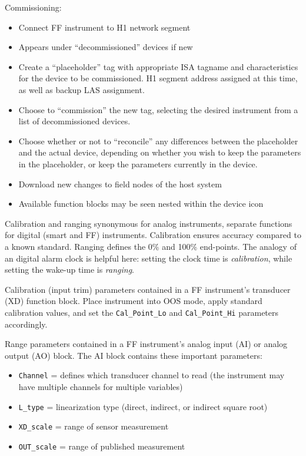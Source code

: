 \vskip 10pt

Commissioning:

\begin{itemize}
\item{} Connect FF instrument to H1 network segment
\item{} Appears under ``decommissioned'' devices if new
\item{} Create a ``placeholder'' tag with appropriate ISA tagname and characteristics for the device to be commissioned.  H1 segment address assigned at this time, as well as backup LAS assignment.
\item{} Choose to ``commission'' the new tag, selecting the desired instrument from a list of decommissioned devices.
\item{} Choose whether or not to ``reconcile'' any differences between the placeholder and the actual device, depending on whether you wish to keep the parameters in the placeholder, or keep the parameters currently in the device.
\item{} Download new changes to field nodes of the host system
\item{} Available function blocks may be seen nested within the device icon
\end{itemize}

\vskip 10pt

Calibration and ranging synonymous for analog instruments, separate functions for digital (smart and FF) instruments.  Calibration ensures accuracy compared to a known standard.  Ranging defines the 0\% and 100\% end-points.  The analogy of an digital alarm clock is helpful here: setting the clock time is {\it calibration}, while setting the wake-up time is {\it ranging}.

Calibration (input trim) parameters contained in a FF instrument's transducer (XD) function block.  Place instrument into OOS mode, apply standard calibration values, and set the {\tt Cal\_Point\_Lo} and {\tt Cal\_Point\_Hi} parameters accordingly.

Range parameters contained in a FF instrument's analog input (AI) or analog output (AO) block.  The AI block contains these important parameters:

\begin{itemize}
\item{} {\tt Channel} = defines which transducer channel to read (the instrument may have multiple channels for multiple variables)
\item{} {\tt L\_type} = linearization type (direct, indirect, or indirect square root)
\item{} {\tt XD\_scale} = range of sensor measurement
\item{} {\tt OUT\_scale} = range of published measurement
\end{itemize}


